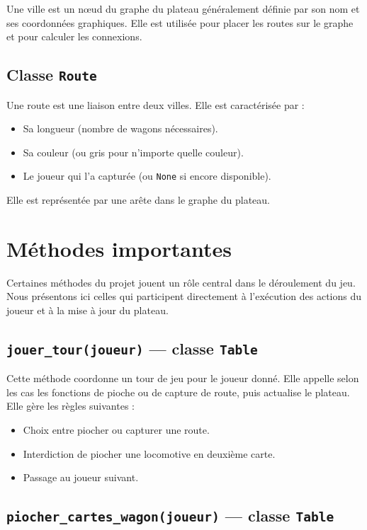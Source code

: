\documentclass[a4paper,12pt]{report}
\begin{document}
Une ville est un nœud du graphe du plateau généralement définie par son nom et ses coordonnées graphiques.
Elle est utilisée pour placer les routes sur le graphe et pour calculer les connexions.

\subsection*{Classe \texttt{Route}}

Une route est une liaison entre deux villes. Elle est caractérisée par :
\begin{itemize}
    \item Sa longueur (nombre de wagons nécessaires).
    \item Sa couleur (ou gris pour n’importe quelle couleur).
    \item Le joueur qui l’a capturée (ou \texttt{None} si encore disponible).
\end{itemize}
Elle est représentée par une arête dans le graphe du plateau.


\section{Méthodes importantes}

Certaines méthodes du projet jouent un rôle central dans le déroulement du jeu.
Nous présentons ici celles qui participent directement à l'exécution des actions du joueur et à la mise à jour du plateau.

\subsection*{\texttt{jouer\_tour(joueur)} — classe \texttt{Table}}

Cette méthode coordonne un tour de jeu pour le joueur donné.
Elle appelle selon les cas les fonctions de pioche ou de capture de route, puis actualise le plateau.
Elle gère les règles suivantes :
\begin{itemize}
    \item Choix entre piocher ou capturer une route.
    \item Interdiction de piocher une locomotive en deuxième carte.
    \item Passage au joueur suivant.
\end{itemize}

\subsection*{\texttt{piocher\_cartes\_wagon(joueur)} — classe \texttt{Table}}
\end{document}
